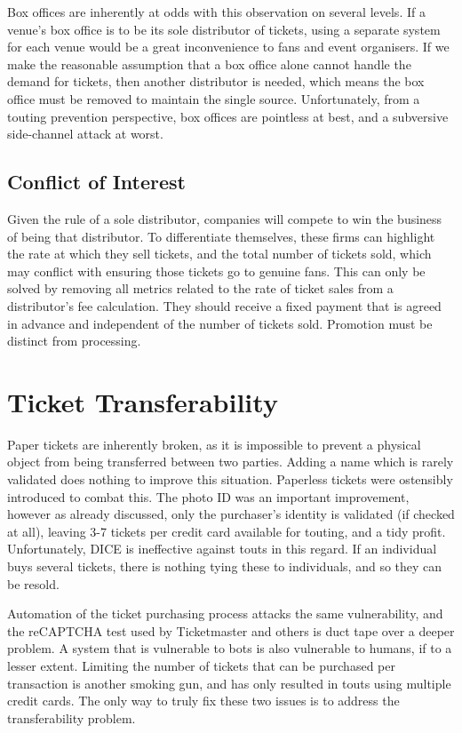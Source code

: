 \documentclass[12pt]{bhamdissertation}
\begin{document}
Box offices are inherently at odds with this observation on several levels. If a venue's box office is to be its sole distributor of tickets, using a separate system for each venue would be a great inconvenience to fans and event organisers. If we make the reasonable assumption that a box office alone cannot handle the demand for tickets, then another distributor is needed, which means the box office must be removed to maintain the single source. Unfortunately, from a touting prevention perspective, box offices are pointless at best, and a subversive side-channel attack at worst.

\subsection{Conflict of Interest}

Given the rule of a sole distributor, companies will compete to win the business of being that distributor. To differentiate themselves, these firms can highlight the rate at which they sell tickets, and the total number of tickets sold, which may conflict with ensuring those tickets go to genuine fans. This can only be solved by removing all metrics related to the rate of ticket sales from a distributor's fee calculation. They should receive a fixed payment that is agreed in advance and independent of the number of tickets sold. Promotion must be distinct from processing.

\section{Ticket Transferability}

Paper tickets are inherently broken, as it is impossible to prevent a physical object from being transferred between two parties. Adding a name which is rarely validated does nothing to improve this situation. Paperless tickets were ostensibly introduced to combat this. The photo ID was an important improvement, however as already discussed, only the purchaser's identity is validated (if checked at all), leaving 3-7 tickets per credit card available for touting, and a tidy profit. Unfortunately, DICE is ineffective against touts in this regard. If an individual buys several tickets, there is nothing tying these to individuals, and so they can be resold.

Automation of the ticket purchasing process attacks the same vulnerability, and the reCAPTCHA test used by Ticketmaster and others is duct tape over a deeper problem. A system that is vulnerable to bots is also vulnerable to humans, if to a lesser extent. Limiting the number of tickets that can be purchased per transaction is another smoking gun, and has only resulted in touts using multiple credit cards. The only way to truly fix these two issues is to address the transferability problem.
\end{document}
